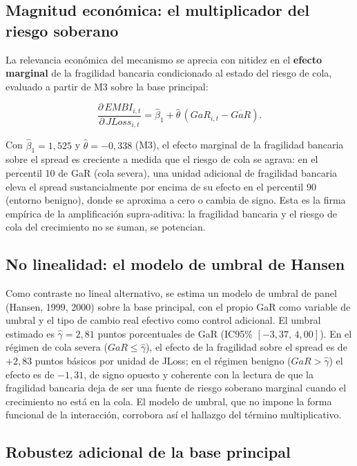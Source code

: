 \documentclass[5p,times,twocolumn,authoryear]{elsarticle}
\begin{document}
\subsection{Magnitud económica: el multiplicador del riesgo soberano}

La relevancia económica del mecanismo se aprecia con nitidez en el \textbf{efecto marginal} de la fragilidad bancaria condicionado al estado del riesgo de cola, evaluado a partir de M3 sobre la base principal:

\[\frac{\partial\,EMBI_{i,t}}{\partial\,JLoss_{i,t}}=\hat\beta_1+\hat\theta\,(GaR_{i,t}-\overline{GaR}).\]

Con $\hat\beta_1=1{,}525$ y $\hat\theta=-0{,}338$ (M3), el efecto marginal de la fragilidad bancaria sobre el spread es creciente a medida que el riesgo de cola se agrava: en el percentil 10 de GaR (cola severa), una unidad adicional de fragilidad bancaria eleva el spread sustancialmente por encima de su efecto en el percentil 90 (entorno benigno), donde se aproxima a cero o cambia de signo. Esta es la firma empírica de la amplificación supra-aditiva: la fragilidad bancaria y el riesgo de cola del crecimiento no se suman, se potencian.

\subsection{No linealidad: el modelo de umbral de Hansen}

Como contraste no lineal alternativo, se estima un modelo de umbral de panel (Hansen, 1999, 2000) sobre la base principal, con el propio GaR como variable de umbral y el tipo de cambio real efectivo como control adicional. El umbral estimado es $\hat\gamma=2{,}81$ puntos porcentuales de GaR (IC95\% $[-3{,}37,\,4{,}00]$). En el régimen de cola severa ($GaR\le\hat\gamma$), el efecto de la fragilidad sobre el spread es de $+2{,}83$ puntos básicos por unidad de JLoss; en el régimen benigno ($GaR>\hat\gamma$) el efecto es de $-1{,}31$, de signo opuesto y coherente con la lectura de que la fragilidad bancaria deja de ser una fuente de riesgo soberano marginal cuando el crecimiento no está en la cola. El modelo de umbral, que no impone la forma funcional de la interacción, corrobora así el hallazgo del término multiplicativo.

\subsection{Robustez adicional de la base principal}
\end{document}
